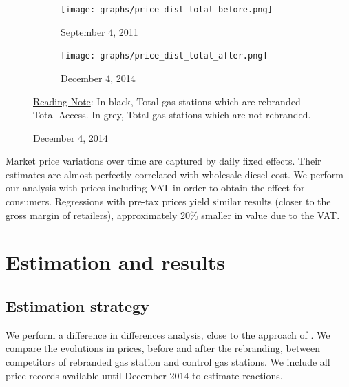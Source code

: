 \documentclass[english]{article}
\begin{document}
\begin{figure}[htb!]
\centering
\caption{Distributions of Total prices before and after rebranding}
\label{fig:price_dist_total_ba}
\begin{subfigure}{.49\textwidth}
\centering
\texttt{[image: graphs/price\_dist\_total\_before.png]}
\caption[short]{September 4, 2011}
\end{subfigure}
\begin{subfigure}{.49\textwidth}
\centering
\texttt{[image: graphs/price\_dist\_total\_after.png]}
\caption[short]{December 4, 2014}
\end{subfigure}
\flushleft
{\footnotesize{}\uline{Reading Note}}{\footnotesize{}: In black, Total gas stations which are rebranded Total Access. In grey, Total gas stations which are not rebranded.}{\footnotesize \par}
\end{figure}

Market price variations over time are captured by daily fixed effects. Their estimates are almost perfectly correlated with wholesale diesel cost. We perform our analysis with prices including VAT in order to obtain the effect for consumers. Regressions with pre-tax prices yield similar results (closer to the gross margin of retailers), approximately 20\% smaller in value due to the VAT.

\section{Estimation and results}

\subsection{Estimation strategy}

We perform a difference in differences analysis, close to the approach of \cite{HAS04}. We compare the evolutions in prices, before and after the rebranding, between competitors of rebranded gas station and control gas stations. We include all price records available until December 2014 to estimate reactions.
\end{document}

